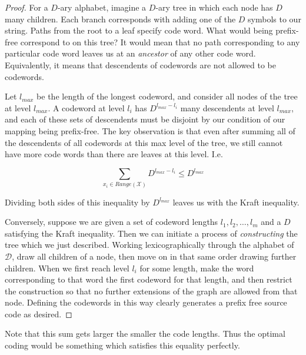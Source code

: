 \begin{proof}
    For a $D$-ary alphabet, imagine a $D$-ary tree in which each node has $D$ many children. Each branch corresponds with adding one of the $D$ symbols to our string. Paths from the root to a leaf specify code word. What would being prefix-free correspond to on this tree? It would mean that no path corresponding to any particular code word leaves us at an \emph{ancestor} of any other code word. Equivalently, it means that descendents of codewords are not allowed to be codewords. 

    Let $l_{max}$ be the length of the longest codeword, and consider all nodes of the tree at level $l_{max}$. A codeword at level $l_i$ has $D^{l_{max}-l_i}$ many descendents at level $l_{max}$, and each of these sets of descendents must be disjoint by our condition of our mapping being prefix-free. The key observation is that even after summing all of the descendents of all codewords at this max level of the tree, we still cannot have more code words than there are leaves at this level. I.e.

    \begin{equation}
        \sum_{x_i \in Range(\mathcal{X})} D^{l_{max}-l_i} \leq D^{l_{max}}
    \end{equation}

    Dividing both sides of this inequality by $D^{l_{max}}$ leaves us with the Kraft inequality. 

    Conversely, suppose we are given a set of codeword lengths $l_1,l_2,\ldots,l_m$ and a $D$ satisfying the Kraft inequality. Then we can initiate a process of \emph{constructing} the tree which we just described. Working lexicographically through the alphabet of $\mathcal{D}$, draw all children of a node, then move on in that same order drawing further children. When we first reach level $l_i$ for some length, make the word corresponding to that word the first codeword for that length, and then restrict the construction so that no further extensions of the graph are allowed from that node. Defining the codewords in this way clearly generates a prefix free source code as desired.
\end{proof}
Note that this sum gets larger the smaller the code lengths. Thus the optimal coding would be something which satisfies this equality perfectly. 

